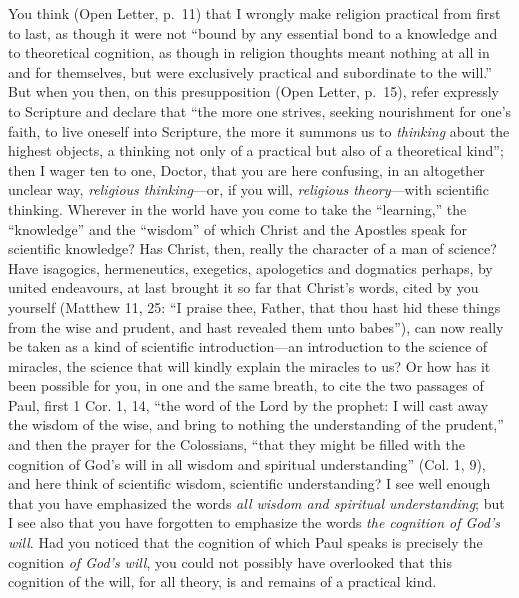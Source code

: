 \documentclass[12pt,a4paper]{article}
\newcommand{\opage}[1]{\marginnote{\footnotesize\textit{[#1]}}}
\begin{document}
You think (Open Letter, p.~11) that I wrongly make
\opage{14}%
religion practical from first to last, as though it were not ``bound
by any essential bond to a knowledge and to theoretical cognition,
as though in religion thoughts meant nothing at all in and for
themselves, but were exclusively practical and subordinate to the
will.'' But when you then, on this presupposition (Open Letter,
p.~15), refer expressly to Scripture and declare that ``the more one
strives, seeking nourishment for one's faith, to live oneself into
Scripture, the more it summons us to \emph{thinking} about the
highest objects, a thinking not only of a practical but also of a
theoretical kind''; then I wager ten to one, Doctor, that you are
here confusing, in an altogether unclear way, \emph{religious
thinking}---or, if you will, \emph{religious theory}---with
scientific thinking. Wherever in the world have you come to take the
``learning,'' the ``knowledge'' and the ``wisdom'' of which Christ
and the Apostles speak for scientific knowledge? Has Christ, then,
really the character of a man of science? Have isagogics,
hermeneutics, exegetics, apologetics and dogmatics perhaps, by united
endeavours, at last brought it so far that Christ's words, cited by
you yourself (Matthew 11, 25: ``I praise thee, Father, that thou
hast hid these things from the wise and prudent, and hast revealed
them unto babes''), can now really be taken as a kind of scientific
introduction---an introduction to the science of miracles, the
science that will kindly explain the miracles to us? Or how has it
been possible for you, in one and the same breath, to cite the two
passages of Paul, first 1 Cor. 1, 14,%
{} ``the word of the Lord by the prophet: I will cast away the wisdom
of the wise, and bring to nothing the understanding of the
prudent,'' and then the prayer for the Colossians, ``that they might
be filled with the cognition of God's will in all wisdom and
spiritual understanding'' (Col. 1, 9), and here think of scientific
wisdom, scientific understanding? I see well enough that you have
emphasized the words \emph{all wisdom and spiritual understanding};
but I see also that you have forgotten to emphasize the words
\emph{the cognition of God's will}. Had you noticed that the
cognition of which Paul
\opage{15}%
speaks is precisely the cognition \emph{of God's will}, you could not
possibly have overlooked that this cognition of the will, for all
theory, is and remains of a practical kind.
\end{document}
